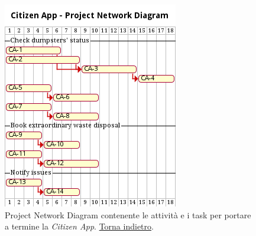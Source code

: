 \begin{figure}[H]
    \centering
    \includegraphics[width=\textwidth]{../img/gantt-citizen-app.pm}
    \caption{Project Network Diagram contenente le attività e i task per portare a termine la \textit{Citizen App}. \hyperlink{back:gantt-citizen-app}{Torna indietro}.}
    \label{fig:gantt-citizen-app}
\end{figure}

